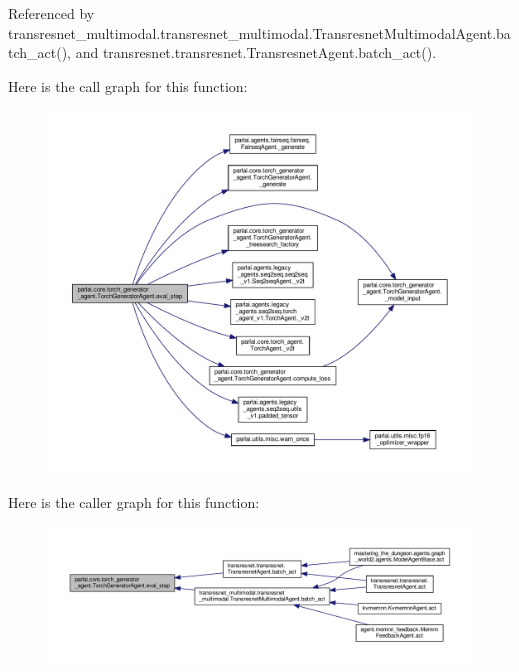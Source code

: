 Referenced by transresnet\+\_\+multimodal.\+transresnet\+\_\+multimodal.\+Transresnet\+Multimodal\+Agent.\+batch\+\_\+act(), and transresnet.\+transresnet.\+Transresnet\+Agent.\+batch\+\_\+act().

Here is the call graph for this function\+:
\nopagebreak
\begin{figure}[H]
\begin{center}
\leavevmode
\includegraphics[width=350pt]{classparlai_1_1core_1_1torch__generator__agent_1_1TorchGeneratorAgent_ac584268dd08c6fcb0045aa968cad8561_cgraph}
\end{center}
\end{figure}
Here is the caller graph for this function\+:
\nopagebreak
\begin{figure}[H]
\begin{center}
\leavevmode
\includegraphics[width=350pt]{classparlai_1_1core_1_1torch__generator__agent_1_1TorchGeneratorAgent_ac584268dd08c6fcb0045aa968cad8561_icgraph}
\end{center}
\end{figure}
\mbox{\label{classparlai_1_1core_1_1torch__generator__agent_1_1TorchGeneratorAgent_a3ed32722f939a8afd258830b7093fc18}} 

